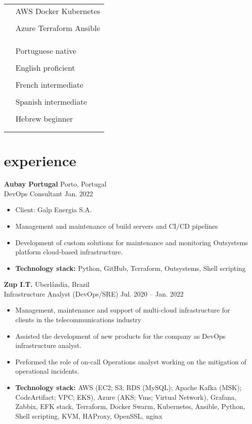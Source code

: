 \documentclass[12pt]{article}
\newcommand{\entry}[4]{{{\textbf{#1}}} \hfill #3 \\ #2 \hfill #4}
\newcommand{\tableentry}[3]{\textsc{#1} & #2\expandafter\ifstrequal\expandafter{#3}{}{\\}{\\[6pt]}}
\begin{document}
\begin{paracol}{2}
\begin{supertabular}{rl}
  \tableentry{\footnotesize\faCloud}{AWS \textperiodcentered{} Docker \textperiodcentered Kubernetes}{}
  \tableentry{}{Azure \textperiodcentered{} Terraform \textperiodcentered{} Ansible}{}
  \tableentry{}{}{}

  \tableentry{\footnotesize\faLanguage}{Portuguese \textperiodcentered{} native}{}
  \tableentry{}{English \textperiodcentered{} proficient}{}
  \tableentry{}{French \textperiodcentered{} intermediate}{}
  \tableentry{}{Spanish \textperiodcentered{} intermediate}{}
  \tableentry{}{Hebrew \textperiodcentered{} beginner}{}
\end{supertabular}

\switchcolumn*

\section{experience}

\entry{Aubay Portugal}{DevOps Consultant}{Porto, Portugal}{Jan. 2022}
\begin{itemize}[noitemsep,leftmargin=3.5mm,rightmargin=0mm,topsep=6pt]
  \item Client: Galp Energia S.A.
  \item Management and maintenance of build servers and CI/CD pipelines
  \item Development of custom solutions for maintenance and monitoring Outsystems platform cloud-based
  infrastructure.
  \item \textbf{Technology stack:} Python, GitHub, Terraform, Outsystems, Shell scripting
\end{itemize}

\medskip

\entry{Zup I.T.}{Infrastructure Analyst (DevOps/SRE)}{Uberlândia, Brazil}{Jul. 2020 -- Jan. 2022}
\begin{itemize}[noitemsep,leftmargin=3.5mm,rightmargin=0mm,topsep=6pt]
  \item Management, maintenance and support of multi-cloud
  infrastructure for clients in the telecommunications industry
  \item Assisted the development of new products for the company as DevOps
  infrastructure analyst.
  \item Performed the role of on-call Operations analyst working on the mitigation
  of operational incidents.
  \item \textbf{Technology stack:} AWS (EC2; S3; RDS (MySQL); Apache Kafka
  (MSK); CodeArtifact; VPC; EKS), Azure (AKS;
  Vms; Virtual Network), Grafana, Zabbix, EFK
  stack, Terraform, Docker Swarm, Kubernetes, Ansible, Python, Shell scripting,
  KVM, HAProxy, OpenSSL, nginx
\end{itemize}


\end{paracol}
\end{document}
